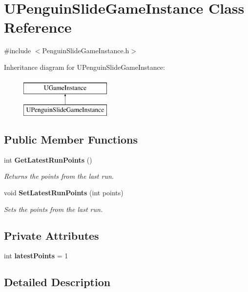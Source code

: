 \section{U\+Penguin\+Slide\+Game\+Instance Class Reference}
\label{class_u_penguin_slide_game_instance}


{\ttfamily \#include $<$Penguin\+Slide\+Game\+Instance.\+h$>$}

Inheritance diagram for U\+Penguin\+Slide\+Game\+Instance\+:\begin{figure}[H]
\begin{center}
\leavevmode
\includegraphics[height=2.000000cm]{class_u_penguin_slide_game_instance}
\end{center}
\end{figure}
\subsection*{Public Member Functions}
\begin{DoxyCompactItemize}
\item 
int \textbf{ Get\+Latest\+Run\+Points} ()
\begin{DoxyCompactList}\small\item\em Returns the points from the last run. \end{DoxyCompactList}\item 
void \textbf{ Set\+Latest\+Run\+Points} (int points)
\begin{DoxyCompactList}\small\item\em Sets the points from the last run. \end{DoxyCompactList}\end{DoxyCompactItemize}
\subsection*{Private Attributes}
\begin{DoxyCompactItemize}
\item 
int \textbf{ latest\+Points} = 1
\end{DoxyCompactItemize}


\subsection{Detailed Description}


